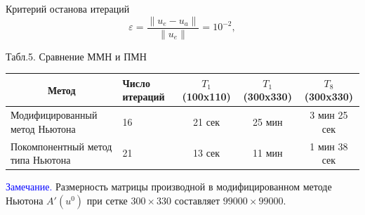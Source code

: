 \documentclass[10pt,pdf, mathserif, hyperref={unicode}]{beamer}
\begin{document}
\begin{frame}
	Критерий останова итераций $$\varepsilon=\frac{\|u_e-u_a\|}{\|u_e\|}=10^{-2},$$
	
	\begin{table}[]
		\centering
		{\scriptsize Табл.5. Сравнение ММН и ПМН}
		\begin{tabular}{|p{}|p{}|c|c|c|}
			\hline
			\multicolumn{1}{|c|}{\textbf{Метод}} & \textbf{Число итераций} & \textbf{$T_1$ (100x110)} & \textbf{$T_1$ (300x330)} & \textbf{$T_8$ (300x330)} \\ \hline
			Модифицированный метод Ньютона       & 16                      & 21 сек          & 25 мин          & 3 мин 25 сек    \\ \hline
			Покомпонентный метод типа Ньютона    & 21                      & 13 сек          & 11 мин          & 1 мин 38 сек    \\ \hline
		\end{tabular}
	\end{table}
	{\textcolor{blue}{Замечание.} Размерность матрицы производной в модифицированном методе Ньютона $A'(u^0)$ при сетке $300\times330$ составляет $99000\times99000$}.
\end{frame}
\end{document}
